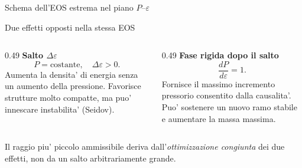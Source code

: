 \begin{frame}{Schema dell'EOS estrema nel piano $P$--$\varepsilon$}
\centering
{}
\end{frame}

\begin{frame}{Due effetti opposti nella stessa EOS}
\small
\begin{columns}[T,onlytextwidth]
\begin{column}{0.49\textwidth}
\textbf{Salto $\Delta\varepsilon$}
\[
P=\text{costante},\quad\Delta\varepsilon>0.
\]
Aumenta la densita' di energia senza un aumento della pressione.
\medskip
Favorisce strutture molto compatte, ma puo' innescare instabilita' (Seidov).
\end{column}
\begin{column}{0.49\textwidth}
\textbf{Fase rigida dopo il salto}
\[
\frac{dP}{d\varepsilon}=1.
\]
Fornisce il massimo incremento pressorio consentito dalla causalita'.
\medskip
Puo' sostenere un nuovo ramo stabile e aumentare la massa massima.
\end{column}
\end{columns}
\medskip
Il raggio piu' piccolo ammissibile deriva dall'\emph{ottimizzazione congiunta} dei due effetti, non da un salto arbitrariamente grande.
\end{frame}

